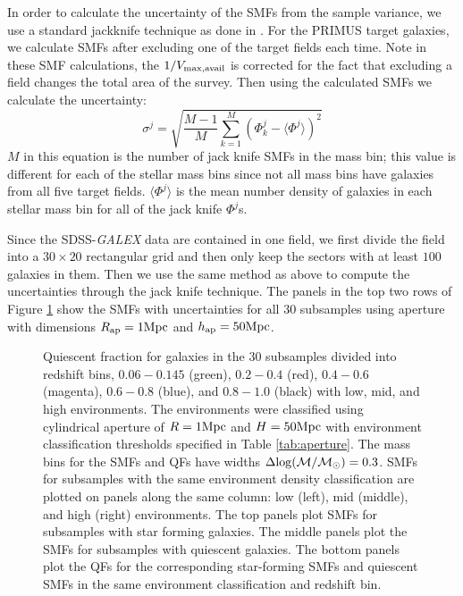 \documentclass{emulateapj}
\begin{document}
In order to calculate the uncertainty of the SMFs from the sample variance, we use a standard jackknife technique as done in \cite{Moustakas:2013aa}.
For the PRIMUS target galaxies, we calculate SMFs after excluding one of the target fields each time.
Note in these SMF calculations, the $1/V_{\rm{max},\rm{avail}}$ is corrected for the fact that excluding a field changes the total area of the survey.
Then using the calculated SMFs we calculate the uncertainty: 
\begin{equation}
\sigma^j = \sqrt{\frac{M-1}{M} \sum\limits_{k=1}^{M} (\Phi^j_k - \langle \Phi^j \rangle)^2}
\end{equation} 
$M$ in this equation is the number of jack knife SMFs in the mass bin; this value is different for each of the stellar mass bins since not all mass bins have galaxies from all five target fields.
$\langle \Phi^j \rangle$ is the mean number density of galaxies in each stellar mass bin for all of the jack knife $\Phi^j$s.

Since the SDSS-{\em GALEX} data are contained in one field, we first divide the field into a $30 \times 20$ rectangular grid and then only keep the sectors with at least $100$ galaxies in them. 
Then we use the same method as above to compute the uncertainties through the jack knife technique. 
The panels in the top two rows of Figure \ref{fig:smf} show the SMFs with uncertainties for all $30$ subsamples using aperture with dimensions $R_{\rm{ap}} = 1 \rm{Mpc}$ and $h_{\rm{ap}} = 50 \rm{Mpc}$.  
\begin{figure*}
    \begin{center}
        \leavevmode
        \label{fig:smf}
        \caption{Quiescent fraction for galaxies in the $30$ subsamples divided into redshift bins, $0.06-0.145$ (green), $0.2-0.4$ (red), $0.4-0.6$ 
(magenta), $0.6-0.8$ (blue), and $0.8-1.0$ (black) with low, mid, and high environments. The environments were classified using cylindrical aperture of $R=1\rm{Mpc}$ and $H=50\rm{Mpc}$ 
with environment classification thresholds specified in Table \ref{tab:aperture}. The mass bins for the SMFs and QFs have widths $\Delta \rm{log}(\mathcal{M}/\mathcal{M}_{\odot})=0.3$. 
SMFs for subsamples with the same environment density classification are plotted on panels along the same column: low (left), mid (middle), and high (right) environments. The top
panels plot SMFs for subsamples with star forming galaxies. The middle panels plot the SMFs for subsamples with quiescent galaxies. The bottom panels plot the QFs for the 
corresponding star-forming SMFs and quiescent SMFs in the same environment classification and redshift bin.}
    \end{center}
\end{figure*}
\end{document}
